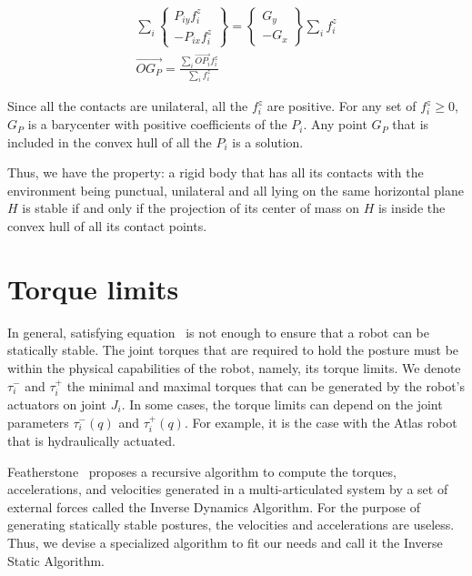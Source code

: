 \begin{align}
\sum\limits_i \left\{\begin{array}{r} P_{iy}f_i^z\\-P_{ix}f_i^z\end{array}\right\}
= \left\{\begin{array}{r} G_{y}\\-G_{x}\end{array}\right\} \sum\limits_i f_i^z\\
  \overrightarrow{OG_P} = \frac{\sum\limits_i \overrightarrow{OP_i} f_i^z}{\sum\limits_i f_i^z}
\end{align}

Since all the contacts are unilateral, all the $f_i^z$ are positive.
For any set of $f_i^z\geq0$, $G_P$ is a barycenter with positive coefficients of the $P_i$.
Any point $G_P$ that is included in the convex hull of all the $P_i$ is a solution.

Thus, we have the property: a rigid body that has all its contacts with the environment being punctual, unilateral and all lying on the same horizontal plane $H$ is stable if and only if the projection of its center of mass on $H$ is inside the convex hull of all its contact points.



\section{Torque limits}
\label{sec:torque_limits}


In general, satisfying equation~ is not enough to ensure that a robot can be statically stable.
The joint torques that are required to hold the posture must be within the physical capabilities of the robot, namely, its torque limits.
We denote $\tau_i^-$ and $\tau_i^+$ the minimal and maximal torques that can be generated by the robot's actuators on joint $J_i$.
In some cases, the torque limits can depend on the joint parameters $\tau_i^-(q)$ and $\tau_i^+(q)$.
For example, it is the case with the Atlas robot that is hydraulically actuated.

Featherstone~\cite{featherstone:book:2007} proposes a recursive algorithm to compute the torques, accelerations, and velocities generated in a multi-articulated system by a set of external forces called the Inverse Dynamics Algorithm.
For the purpose of generating statically stable postures, the velocities and accelerations are useless.
Thus, we devise a specialized algorithm to fit our needs and call it the Inverse Static Algorithm.

